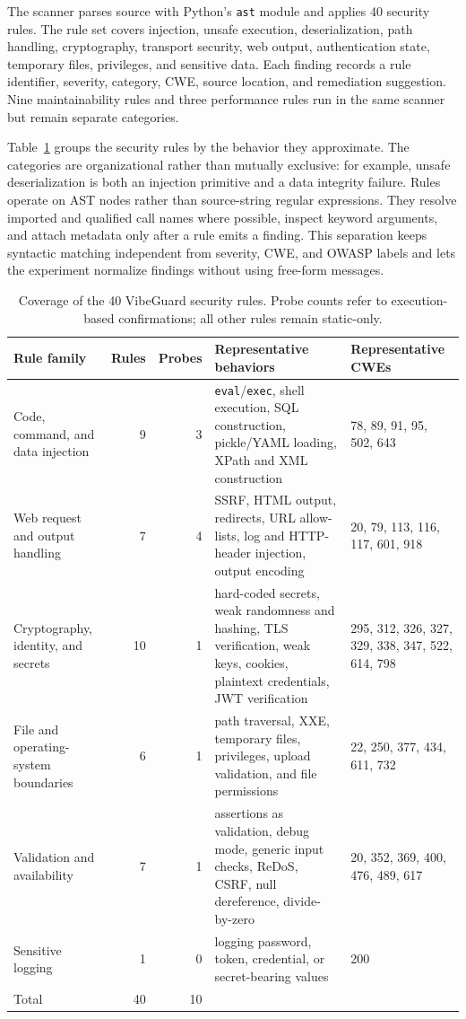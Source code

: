\documentclass[sigconf,nonacm]{acmart}
\begin{document}
The scanner parses source with Python's \texttt{ast} module and applies 40
security rules. The rule set covers injection, unsafe execution,
deserialization, path handling, cryptography, transport security, web output,
authentication state, temporary files, privileges, and sensitive data. Each
finding records a rule identifier, severity, category, CWE, source location,
and remediation suggestion. Nine maintainability rules and three performance
rules run in the same scanner but remain separate categories.

Table~\ref{tab:rule-coverage} groups the security rules by the behavior they
approximate. The categories are organizational rather than mutually exclusive:
for example, unsafe deserialization is both an injection primitive and a data
integrity failure. Rules operate on AST nodes rather than source-string regular
expressions. They resolve imported and qualified call names where possible,
inspect keyword arguments, and attach metadata only after a rule emits a
finding. This separation keeps syntactic matching independent from severity,
CWE, and OWASP labels and lets the experiment normalize findings without using
free-form messages.

\begin{table}[t]
\caption{Coverage of the 40 VibeGuard security rules. Probe counts refer to
execution-based confirmations; all other rules remain static-only.}
\label{tab:rule-coverage}
\centering
\small
\begin{tabularx}{\textwidth}{lrrXl}
\toprule
Rule family & Rules & Probes & Representative behaviors & Representative CWEs \\
\midrule
Code, command, and data injection & 9 & 3 & \texttt{eval}/\texttt{exec}, shell execution, SQL construction, pickle/YAML loading, XPath and XML construction & 78, 89, 91, 95, 502, 643 \\
Web request and output handling & 7 & 4 & SSRF, HTML output, redirects, URL allow-lists, log and HTTP-header injection, output encoding & 20, 79, 113, 116, 117, 601, 918 \\
Cryptography, identity, and secrets & 10 & 1 & hard-coded secrets, weak randomness and hashing, TLS verification, weak keys, cookies, plaintext credentials, JWT verification & 295, 312, 326, 327, 329, 338, 347, 522, 614, 798 \\
File and operating-system boundaries & 6 & 1 & path traversal, XXE, temporary files, privileges, upload validation, and file permissions & 22, 250, 377, 434, 611, 732 \\
Validation and availability & 7 & 1 & assertions as validation, debug mode, generic input checks, ReDoS, CSRF, null dereference, divide-by-zero & 20, 352, 369, 400, 476, 489, 617 \\
Sensitive logging & 1 & 0 & logging password, token, credential, or secret-bearing values & 200 \\
\midrule
Total & 40 & 10 & & \\
\bottomrule
\end{tabularx}
\end{table}
\end{document}
